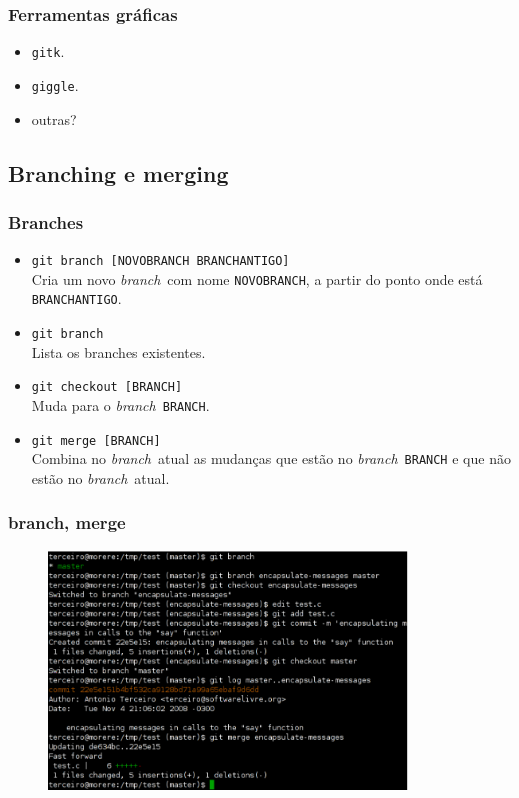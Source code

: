 \documentclass{beamer}
\newcommand{\branch}{\emph{branch}}
\begin{document}
\begin{frame}
  \frametitle{Ferramentas gráficas}
  \begin{itemize}
    \item \texttt{gitk}.
    \item \texttt{giggle}.
    \item outras?
  \end{itemize}
\end{frame}

\subsection{Branching e merging}

\begin{frame}
  \frametitle{Branches}
  \begin{itemize}
    \item \texttt{git branch [NOVOBRANCH BRANCHANTIGO]}\\
      Cria um novo \branch\ com nome \texttt{NOVOBRANCH}, a partir do
      ponto onde está \texttt{BRANCHANTIGO}.
      \pause

    \item \texttt{git branch}\\
      Lista os branches existentes.
      \pause

    \item \texttt{git checkout [BRANCH]}\\
      Muda para o \branch\ \texttt{BRANCH}.
      \pause

    \item \texttt{git merge [BRANCH]}\\
      Combina no \branch\ atual as mudanças que estão no \branch\ 
      \texttt{BRANCH} e que não estão no \branch\ atual.
  \end{itemize}
\end{frame}

\begin{frame}
  \frametitle{branch, merge}
  \begin{figure}[h]
    \begin{center}
      \includegraphics[width=0.85\textwidth]{figs/git-screenshot-branch-merge.pdf}
    \end{center}
    \label{fig:git-branch-merge}
  \end{figure}
\end{frame}
\end{document}
